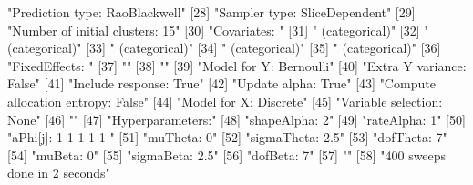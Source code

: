 \documentclass{article}
\begin{document}
\begin{description}
\begin{Schunk}
\begin{Soutput}
[27] "Prediction type: RaoBlackwell"                                             
[28] "Sampler type: SliceDependent"                                              
[29] "Number of initial clusters: 15"                                            
[30] "Covariates: "                                                              
[31] " (categorical)"                                                 
[32] " (categorical)"                                                 
[33] " (categorical)"                                                 
[34] " (categorical)"                                                 
[35] " (categorical)"                                                 
[36] "FixedEffects: "                                                            
[37] ""                                                           
[38] ""                                                           
[39] "Model for Y: Bernoulli"                                                    
[40] "Extra Y variance: False"                                                   
[41] "Include response: True"                                                    
[42] "Update alpha: True"                                                        
[43] "Compute allocation entropy: False"                                         
[44] "Model for X: Discrete"                                                     
[45] "Variable selection: None"                                                  
[46] ""                                                                          
[47] "Hyperparameters:"                                                          
[48] "shapeAlpha: 2"                                                             
[49] "rateAlpha: 1"                                                              
[50] "aPhi[j]: 1 1 1 1 1 "                                                       
[51] "muTheta: 0"                                                                
[52] "sigmaTheta: 2.5"                                                           
[53] "dofTheta: 7"                                                               
[54] "muBeta: 0"                                                                 
[55] "sigmaBeta: 2.5"                                                            
[56] "dofBeta: 7"                                                                
[57] ""                                                                          
[58] "400 sweeps done in 2 seconds"                                              
\end{Soutput}
\end{Schunk}


\end{description}
\end{document}
